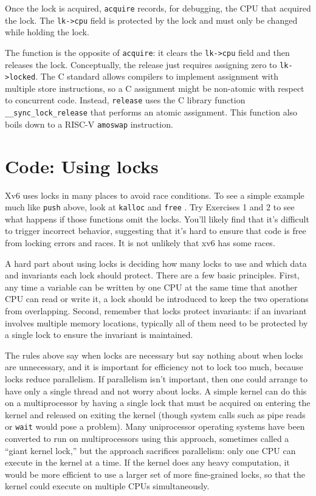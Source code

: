 Once the lock is acquired,
\lstinline{acquire}
records, for debugging, the CPU 
that acquired the lock.
The
\lstinline{lk->cpu}
field is protected by the lock
and must only be changed while holding the lock.

The function
is the opposite of 
\lstinline{acquire}:
it clears the 
\lstinline{lk->cpu}
field
and then releases the lock.
Conceptually, the release just requires assigning zero to
\lstinline{lk->locked}.
The C standard allows compilers to implement assignment
with multiple store instructions,
so a C assignment might be non-atomic with respect
to concurrent code.
Instead,
\lstinline{release}
uses the C library function
\lstinline{__sync_lock_release}
that performs an atomic assignment.
This function also boils down to a RISC-V
\lstinline{amoswap}
instruction.
\section{Code: Using locks}
Xv6 uses locks in many places to avoid race conditions.
To see a simple example much like
\lstinline{push}
above,
look at
\lstinline{kalloc}
and
\lstinline{free}
.
Try Exercises 1 and 2 to see what happens if those
functions omit the locks.
You'll likely find that it's difficult to trigger incorrect
behavior, suggesting that it's hard to ensure that code
is free from locking errors and races.
It is not unlikely that xv6 has some races.

A hard part about using locks is deciding how many locks
to use and which data and invariants each lock should protect.
There are a few basic principles.
First, any time a variable can be written by one CPU
at the same time that another CPU can read or write it,
a lock should be introduced to keep the two
operations from overlapping.
Second, remember that locks protect invariants:
if an invariant involves multiple memory locations,
typically all of them need to be protected
by a single lock to ensure the invariant is maintained.

The rules above say when locks are necessary but say nothing about when locks
are unnecessary, and it is important for efficiency not to lock too much,
because locks reduce parallelism.  If parallelism isn't important, then one
could arrange to have only a single thread and not worry about locks.  A simple
kernel can do this on a multiprocessor by having a single lock that must be
acquired on entering the kernel and released on exiting the kernel (though
system calls such as pipe reads or
\lstinline{wait}
would pose a problem).  Many uniprocessor operating systems have been converted to
run on multiprocessors using this approach, sometimes called a ``giant
kernel lock,'' but the approach sacrifices parallelism: only one
CPU can execute in the kernel at a time.  If the kernel does any heavy
computation, it would be more efficient to use a larger set of more
fine-grained locks, so that the kernel could execute on multiple CPUs
simultaneously.


